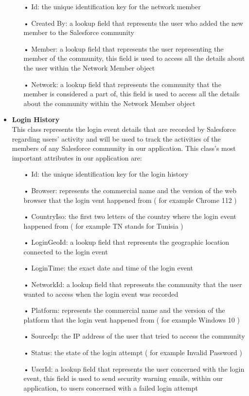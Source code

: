 \begin{itemize}
\begin{itemize}
\item[•] Id: the unique identification key for the network member
\item[•] Created By: a lookup field that represents the user who added the new member to the Salesforce community 
\item[•] Member: a lookup field that represents the user representing the member of the community, this field is used to access all the details about the user within the Network Member object
\item[•] Network: a lookup field that represents the community that the member is considered a part of, this field is used to access all the details about the community within the Network Member object


\end{itemize}

\item \textbf{Login History}\\
This class represents the login event details that are recorded by Salesforce regarding users' activity and will be used to track the activities of the members of any Salesforce community in our application. This class's most important attributes in our application are:
\begin{itemize}
\item[•] Id: the unique identification key for the login history
\item[•] Browser: represents the commercial name and the version of the web browser that the login vent happened from ( for example Chrome 112 ) 
\item[•] CountryIso: the first two letters of the country where the login event happened from ( for example TN stands for Tunisia )
\item[•] LoginGeoId: a lookup field that represents the geographic location connected to the login event
\item[•] LoginTime: the exact date and time of the login event
\item[•] NetworkId:  a lookup field that represents the community that the user wanted to access when the login event was recorded
\item[•] Platform: represents the commercial name and the version of the platform that the login vent happened from ( for example Windows 10 )
\item[•] SourceIp: the IP address of the user that tried to access the community 
\item[•] Status: the state of the login attempt ( for example Invalid Password )
\item[•] UserId: a lookup field that represents the user concerned with the login event, this field is used to send security warning emails, within our application, to users concerned with a failed login attempt 


\end{itemize}
\end{itemize}

